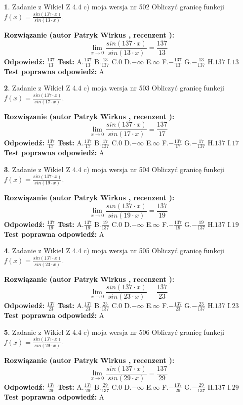 \documentclass[12pt, a4paper]{article}
\theoremstyle{definition} %
\newtheorem{zad}{}
\newcommand{\zadStart}[1]{\begin{zad}#1\newline}
\newcommand{\zadStop}{\end{zad}}
\newcommand{\rozwStart}[2]{\noindent \textbf{Rozwiązanie (autor #1 , recenzent #2): }\newline}
\newcommand{\rozwStop}{\newline}
\newcommand{\odpStart}{\noindent \textbf{Odpowiedź:}\newline}
\newcommand{\odpStop}{\newline}
\newcommand{\testStart}{\noindent \textbf{Test:}\newline}
\newcommand{\testStop}{\newline}
\newcommand{\kluczStart}{\noindent \textbf{Test poprawna odpowiedź:}\newline}
\newcommand{\kluczStop}{\newline}
\begin{document}
\zadStart{Zadanie z Wikieł Z 4.4 c) moja wersja nr 502}
Obliczyć granicę funkcji $f(x)=\frac{sin(137\cdot x)}{sin(13\cdot x)}$.
\zadStop
\rozwStart{Patryk Wirkus}{}
$$\lim\limits_{x\to 0}\frac{sin(137\cdot x)}{sin(13\cdot x)}=
\frac{137}{13}$$
\rozwStop
\odpStart
$\frac{137}{13}$
\odpStop
\testStart
A.$\frac{137}{13}$
B.$\frac{13}{137}$
C.$0$
D.$-\infty$
E.$\infty$
F.$-\frac{137}{13}$
G.$-\frac{13}{137}$
H.$137$
I.$13$
\testStop
\kluczStart
A
\kluczStop



\zadStart{Zadanie z Wikieł Z 4.4 c) moja wersja nr 503}
Obliczyć granicę funkcji $f(x)=\frac{sin(137\cdot x)}{sin(17\cdot x)}$.
\zadStop
\rozwStart{Patryk Wirkus}{}
$$\lim\limits_{x\to 0}\frac{sin(137\cdot x)}{sin(17\cdot x)}=
\frac{137}{17}$$
\rozwStop
\odpStart
$\frac{137}{17}$
\odpStop
\testStart
A.$\frac{137}{17}$
B.$\frac{17}{137}$
C.$0$
D.$-\infty$
E.$\infty$
F.$-\frac{137}{17}$
G.$-\frac{17}{137}$
H.$137$
I.$17$
\testStop
\kluczStart
A
\kluczStop



\zadStart{Zadanie z Wikieł Z 4.4 c) moja wersja nr 504}
Obliczyć granicę funkcji $f(x)=\frac{sin(137\cdot x)}{sin(19\cdot x)}$.
\zadStop
\rozwStart{Patryk Wirkus}{}
$$\lim\limits_{x\to 0}\frac{sin(137\cdot x)}{sin(19\cdot x)}=
\frac{137}{19}$$
\rozwStop
\odpStart
$\frac{137}{19}$
\odpStop
\testStart
A.$\frac{137}{19}$
B.$\frac{19}{137}$
C.$0$
D.$-\infty$
E.$\infty$
F.$-\frac{137}{19}$
G.$-\frac{19}{137}$
H.$137$
I.$19$
\testStop
\kluczStart
A
\kluczStop



\zadStart{Zadanie z Wikieł Z 4.4 c) moja wersja nr 505}
Obliczyć granicę funkcji $f(x)=\frac{sin(137\cdot x)}{sin(23\cdot x)}$.
\zadStop
\rozwStart{Patryk Wirkus}{}
$$\lim\limits_{x\to 0}\frac{sin(137\cdot x)}{sin(23\cdot x)}=
\frac{137}{23}$$
\rozwStop
\odpStart
$\frac{137}{23}$
\odpStop
\testStart
A.$\frac{137}{23}$
B.$\frac{23}{137}$
C.$0$
D.$-\infty$
E.$\infty$
F.$-\frac{137}{23}$
G.$-\frac{23}{137}$
H.$137$
I.$23$
\testStop
\kluczStart
A
\kluczStop



\zadStart{Zadanie z Wikieł Z 4.4 c) moja wersja nr 506}
Obliczyć granicę funkcji $f(x)=\frac{sin(137\cdot x)}{sin(29\cdot x)}$.
\zadStop
\rozwStart{Patryk Wirkus}{}
$$\lim\limits_{x\to 0}\frac{sin(137\cdot x)}{sin(29\cdot x)}=
\frac{137}{29}$$
\rozwStop
\odpStart
$\frac{137}{29}$
\odpStop
\testStart
A.$\frac{137}{29}$
B.$\frac{29}{137}$
C.$0$
D.$-\infty$
E.$\infty$
F.$-\frac{137}{29}$
G.$-\frac{29}{137}$
H.$137$
I.$29$
\testStop
\kluczStart
A
\kluczStop
\end{document}
